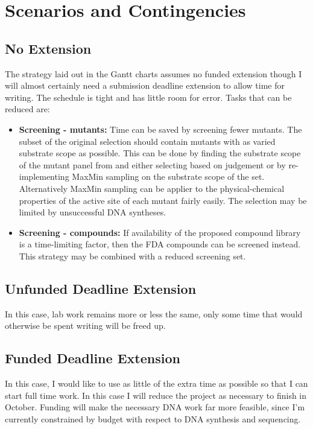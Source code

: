\documentclass{article}
\begin{document}
\section{Scenarios and Contingencies} \label{contingencies}

\subsection{No Extension}
The strategy laid out in the Gantt charts assumes no funded extension though I will almost certainly need a submission deadline extension to allow time for writing. The schedule is tight and has little room for error. Tasks that can be reduced are:
\begin{itemize}
	\item \textbf{Screening - mutants:} Time can be saved by screening fewer mutants. The subset of the original selection should contain mutants with as varied substrate scope as possible. This can be done by finding the substrate scope of the mutant panel from \cite{whitehouse2012p450} and either selecting based on judgement or by re-implementing MaxMin sampling on the substrate scope of the set. Alternatively MaxMin sampling can be applier to the physical-chemical properties of the active site of each mutant fairly easily. The selection may be limited by unsuccessful DNA syntheses.
	\item \textbf{Screening - compounds:} If availability of the proposed compound library is a time-limiting factor, then the FDA compounds can be screened instead. This strategy may be combined with a reduced screening set.
\end{itemize}

\subsection{Unfunded Deadline Extension}
In this case, lab work remains more or less the same, only some time that would otherwise be spent writing will be freed up. 

\subsection{Funded Deadline Extension}
In this case, I would like to use as little of the extra time as possible so that I can start full time work. In this case I will reduce the project as necessary to finish in October. Funding will make the necessary DNA work far more feasible, since I'm currently constrained by budget with respect to DNA synthesis and sequencing.
\end{document}
